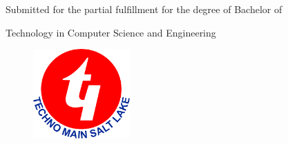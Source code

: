 \begin{titlepage}
\begin{center}
{{\begin{minipage}{\textwidth}
                \noindent{}\par

                \vspace{0.11cm}

                \noindent{}\par

                \vspace{0.11cm}

                \noindent{}\par
                
            \end{minipage}%
        }
        }


        \vspace{3\baselineskip}
        
        {\Large {}} \par
        \vspace{1\baselineskip} 
        

        {\fontsize{16.8}{11}\selectfont {}Submitted for the partial fulfillment for the degree of Bachelor of} \par

        {\fontsize{16.8}{11}\selectfont {}Technology in Computer Science and Engineering} \par

        \vspace{3\baselineskip}

        \begin{figure}[!h]
            \centering
            \includegraphics[width=37mm]{./Images/tmsl.png}
        \end{figure}
        

\end{center}
\end{titlepage}
